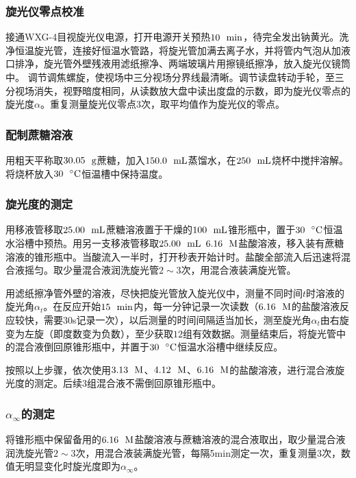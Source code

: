 \documentclass[12pt]{article}
\begin{document}
			\subsubsection{旋光仪零点校准}
			接通WXG-4目视旋光仪电源，打开电源开关预热$10\ \ {\rm min}$，待完全发出钠黄光。洗净恒温旋光管，连接好恒温水管路，将旋光管加满去离子水，并将管内气泡从加液口排净，旋光管外壁残液用滤纸擦净、两端玻璃片用擦镜纸擦净，放入旋光仪镜筒中。
			调节调焦螺旋，使视场中三分视场分界线最清晰。调节读盘转动手轮，至三分视场消失，视野暗度相同，从读数放大盘中读出度盘的示数，即为旋光仪零点的旋光度$\alpha$。重复测量旋光仪零点3次，取平均值作为旋光仪的零点。
			
			\subsubsection{配制蔗糖溶液}
			用粗天平称取$30.05\ \ {\rm g}$蔗糖，加入$150.0 \ \ {\rm mL}$蒸馏水，在$250\ \ {\rm mL}$烧杯中搅拌溶解。将烧杯放入$30\ \ {\rm ^{\circ}C}$恒温槽中保持温度。
				
			\subsubsection{旋光度的测定}
			用移液管移取$25.00 \ \ {\rm mL}$蔗糖溶液置于干燥的$100 \ \ {\rm mL}$锥形瓶中，置于$30\ \ {\rm ^{\circ}C}$恒温水浴槽中预热。用另一支移液管移取$25.00 \ \ {\rm mL}$ $6.16\ \ {\rm M}$盐酸溶液，移入装有蔗糖溶液的锥形瓶中。当酸流入一半时，打开秒表开始计时。盐酸全部流入后迅速将混合液摇匀。取少量混合液润洗旋光管$2\sim 3$次，用混合液装满旋光管。\par 
			用滤纸擦净管外壁的溶液，尽快把旋光管放入旋光仪中，测量不同时间$t$时溶液的旋光角$\alpha_{t}$。在反应开始$15\ \ {\rm min}$内，每一分钟记录一次读数（$6.16\ \ {\rm M}$的盐酸溶液反应较快，需要30s记录一次），以后测量的时间间隔适当加长，测至旋光角$\alpha_{t}$由右旋变为左旋（即度数变为负数），至少获取$12$组有效数据。测量结束后，将旋光管中的混合液倒回原锥形瓶中，并置于$30\ \ {\rm ^{\circ}C}$恒温水浴槽中继续反应。\par 
			按照以上步骤，依次使用$3.13\ \ {\rm M}$、$4.12\ \ {\rm M}$、$6.16\ \ {\rm M}$的盐酸溶液，进行混合液旋光度的测定。后续3组混合液不需倒回原锥形瓶中。
				
			\subsubsection{$\alpha_{\infty}$的测定}
			将锥形瓶中保留备用的$6.16\ \ {\rm M}$盐酸溶液与蔗糖溶液的混合液取出，取少量混合液润洗旋光管$2\sim 3$次，用混合液装满旋光管，每隔5min测定一次，重复测量3次，数值无明显变化时旋光度即为$\alpha_{\infty}$。
\end{document}
